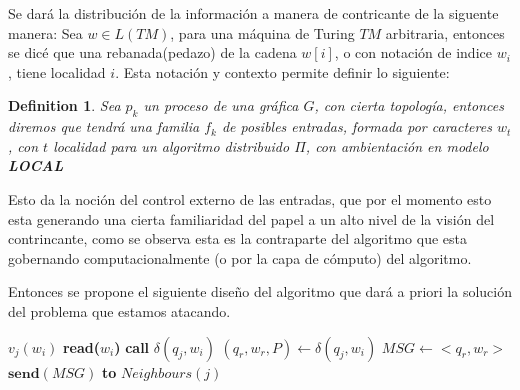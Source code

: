 \documentclass[10pt]{report}
\newtheorem{definition}{Definition}
\begin{document}
    Se dará la distribución de la información a manera de contricante de la siguente manera:\newline
    \hfill
    Sea $w\in L(TM)$, para una máquina de Turing $TM$ arbitraria, entonces se dicé que una rebanada(pedazo) de la cadena
    $w[i]$, o con notación de indice $w_{i}$, tiene localidad $i$.\newline
    Esta notación y contexto permite definir lo siguiente:
    \theoremstyle{definition}
    \begin{definition}
        Sea $p_{k}$ un proceso de una gráfica $G$, con cierta topología, entonces
        diremos que tendrá una familia $f_{k}$ de posibles entradas, formada por caracteres $w_{t}$, con $t$ localidad para un algoritmo
        distribuido $\Pi$, con ambientación en modelo \textbf{LOCAL}

    \end{definition}
    Esto da la noción del control externo de las entradas, que por el momento esto esta generando
    una cierta familiaridad del papel a un alto nivel de la visión del contrincante, como se observa
    esta es la contraparte del algoritmo que esta gobernando computacionalmente (o por la capa de cómputo)
    del algoritmo.
    \hfill
    \newline

    Entonces se propone el siguiente diseño del algoritmo que dará a priori
    la solución del problema que estamos atacando.

    \begin{algorithm}
        \caption{$Simula\char95Algo\char95TM(w)$}\label{alg:simula}
        \begin{algorithmic}
                  \STATE $v_{j}(w_{i})$
                  \STATE \textbf{read($w_{i}$)}
                     \STATE \textbf{call} $\delta(q_{j},w_{i})$
                     \STATE $(q_{r},w_{r},P)\gets \delta(q_{j},w_{i})$
                  \ENDWHILE
                  \ENDIF
                  \ELSE
                       \STATE $MSG\gets<q_{r},w_{r}>$
                       \STATE $\textbf{send}(MSG)$ \textbf{to} $Neighbours(j)$ 
               \ENDFOR
        \end{algorithmic}
    \end{algorithm}
    \newline
\end{document}
